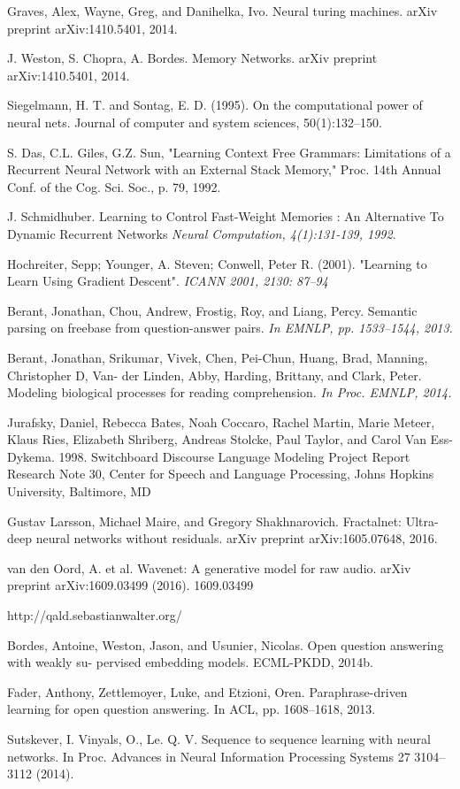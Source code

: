 \documentclass[a4paper,10pt]{article}
\begin{document}
\begin{thebibliography}{9}

Graves, Alex, Wayne, Greg, and Danihelka, Ivo. Neural turing machines. arXiv preprint arXiv:1410.5401, 2014.

 J. Weston, S. Chopra, A. Bordes. Memory Networks. arXiv preprint arXiv:1410.5401, 2014.

 Siegelmann, H. T. and Sontag, E. D. (1995). On the computational power of neural nets.
Journal of computer and system sciences, 50(1):132–150.

 S. Das, C.L. Giles, G.Z. Sun, "Learning Context Free Grammars: Limitations of a Recurrent Neural Network with an External Stack Memory," Proc. 14th Annual Conf. of the Cog. Sci. Soc., p. 79, 1992.

 J. Schmidhuber. Learning to Control Fast-Weight Memories : An Alternative To Dynamic Recurrent Networks 
\textit{Neural Computation, 4(1):131-139, 1992}. 

 Hochreiter, Sepp; Younger, A. Steven; Conwell, Peter R. (2001). "Learning to Learn Using Gradient Descent". \textit{ICANN 2001, 2130: 87–94}

 Berant, Jonathan, Chou, Andrew, Frostig, Roy, and Liang, Percy. Semantic parsing on freebase from question-answer pairs. \textit{In EMNLP, pp. 1533–1544, 2013.}

 Berant, Jonathan, Srikumar, Vivek, Chen, Pei-Chun, Huang, Brad, Manning, Christopher D, Van- der Linden, Abby, Harding, Brittany, and Clark, Peter. Modeling biological processes for reading comprehension. \textit{In Proc. EMNLP, 2014.}

 Jurafsky, Daniel, Rebecca Bates, Noah Coccaro, Rachel Martin, Marie Meteer, Klaus Ries, Elizabeth Shriberg, Andreas Stolcke, Paul Taylor, and Carol Van Ess-Dykema. 1998. Switchboard Discourse Language Modeling Project Report Research Note 30, Center for Speech and Language Processing, Johns Hopkins University, Baltimore, MD

 Gustav Larsson, Michael Maire, and Gregory Shakhnarovich. Fractalnet: Ultra-deep neural networks without residuals. arXiv preprint arXiv:1605.07648, 2016.

 van den Oord, A. et al. Wavenet: A generative model for raw audio. arXiv preprint arXiv:1609.03499 (2016). 1609.03499

 http://qald.sebastianwalter.org/

 Bordes, Antoine, Weston, Jason, and Usunier, Nicolas. Open question answering with weakly su- pervised embedding models. ECML-PKDD, 2014b.

 Fader, Anthony, Zettlemoyer, Luke, and Etzioni, Oren. Paraphrase-driven learning for open question answering. In ACL, pp. 1608–1618, 2013.

 Sutskever, I. Vinyals, O., Le. Q. V. Sequence to sequence learning with neural networks. In Proc. Advances in Neural Information Processing Systems 27 3104–3112 (2014). 

\end{thebibliography}
\end{document}
